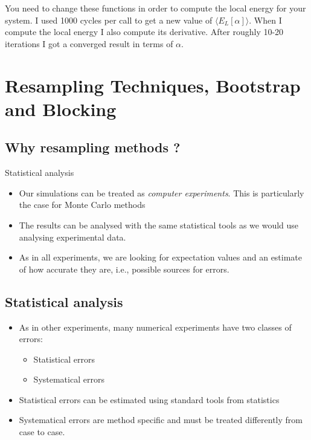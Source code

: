 \documentclass[%
oneside,                 %
final,                   %
10pt]{article}
\begin{document}
You need to change these functions in order to compute the local energy for your system. I used 1000
cycles per call to get a new value of $\langle E_L[\alpha]\rangle$.
When I compute the local energy I also compute its derivative.
After roughly 10-20 iterations I got a converged result in terms of $\alpha$.

\section*{Resampling Techniques, Bootstrap and Blocking}

\subsection*{Why resampling methods ?}
 Statistical analysis
\begin{itemize}
    \item Our simulations can be treated as \emph{computer experiments}. This is particularly the case for Monte Carlo methods

    \item The results can be analysed with the same statistical tools as we would use analysing experimental data.

    \item As in all experiments, we are looking for expectation values and an estimate of how accurate they are, i.e., possible sources for errors.
\end{itemize}

\noindent
\subsection*{Statistical analysis}

\begin{itemize}
    \item As in other experiments, many numerical  experiments have two classes of errors:
\begin{itemize}

      \item Statistical errors

      \item Systematical errors

\end{itemize}

\noindent
    \item Statistical errors can be estimated using standard tools from statistics

    \item Systematical errors are method specific and must be treated differently from case to case. 
\end{itemize}
\end{document}
